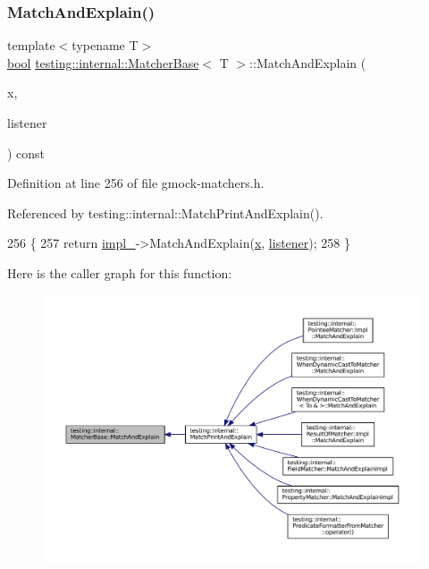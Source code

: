 \subsubsection{\texorpdfstring{Match\+And\+Explain()}{MatchAndExplain()}}
{\footnotesize\ttfamily template$<$typename T$>$ \\
\hyperlink{classbool}{bool} \hyperlink{classtesting_1_1internal_1_1MatcherBase}{testing\+::internal\+::\+Matcher\+Base}$<$ T $>$\+::Match\+And\+Explain (\begin{DoxyParamCaption}\item[{T}]{x,  }\item[{\hyperlink{classtesting_1_1MatchResultListener}{Match\+Result\+Listener} $\ast$}]{listener }\end{DoxyParamCaption}) const\hspace{0.3cm}{\ttfamily [inline]}}



Definition at line 256 of file gmock-\/matchers.\+h.



Referenced by testing\+::internal\+::\+Match\+Print\+And\+Explain().


\begin{DoxyCode}
256                                                                  \{
257     \textcolor{keywordflow}{return} \hyperlink{classtesting_1_1internal_1_1MatcherBase_ab4bf73686e35b5f033e7db82498644aa}{impl\_}->MatchAndExplain(\hyperlink{namespaceinteractive__marker_acda52804aef30b460a72fb21ee01d69d}{x}, \hyperlink{namespaceinteractive__marker_a0e579ab555212bb5e2c9f8a675b7618a}{listener});
258   \}
\end{DoxyCode}
Here is the caller graph for this function\+:
\nopagebreak
\begin{figure}[H]
\begin{center}
\leavevmode
\includegraphics[width=350pt]{classtesting_1_1internal_1_1MatcherBase_a08429a6d7e7d330de4a4eb4e272105a7_icgraph}
\end{center}
\end{figure}
\mbox{\label{classtesting_1_1internal_1_1MatcherBase_a3b479673ff40cac1a7d548e91d789cb2}} 
